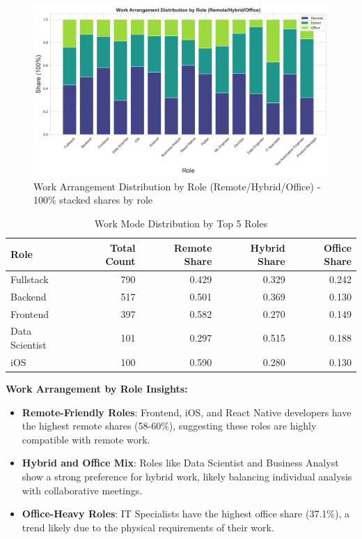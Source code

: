 \documentclass[12pt,a4paper]{article}
\begin{document}
\begin{figure}[H]
	\centering
	\includegraphics[width=\textwidth]{figures/barplot_work_arrangement_by_role.png}
	\caption{Work Arrangement Distribution by Role (Remote/Hybrid/Office) - 100\% stacked shares by role}
\end{figure}

\begin{table}[H]
	\centering
	\small
	\begin{tabular}{lrrrr}
		\toprule
		\textbf{Role}  & \textbf{Total Count} & \textbf{Remote Share} & \textbf{Hybrid Share} & \textbf{Office Share} \\
		\midrule
		Fullstack      & 790                  & 0.429                 & 0.329                 & 0.242                 \\
		Backend        & 517                  & 0.501                 & 0.369                 & 0.130                 \\
		Frontend       & 397                  & 0.582                 & 0.270                 & 0.149                 \\
		Data Scientist & 101                  & 0.297                 & 0.515                 & 0.188                 \\
		iOS            & 100                  & 0.590                 & 0.280                 & 0.130                 \\
		\bottomrule
	\end{tabular}
	\caption{Work Mode Distribution by Top 5 Roles}
\end{table}

\textbf{Work Arrangement by Role Insights:}
\begin{itemize}
	\item \textbf{Remote-Friendly Roles}: Frontend, iOS, and React Native developers have the highest remote shares (58-60\%), suggesting these roles are highly compatible with remote work.
	\item \textbf{Hybrid and Office Mix}: Roles like Data Scientist and Business Analyst show a strong preference for hybrid work, likely balancing individual analysis with collaborative meetings.
	\item \textbf{Office-Heavy Roles}: IT Specialists have the highest office share (37.1\%), a trend likely due to the physical requirements of their work.
\end{itemize}
\end{document}
